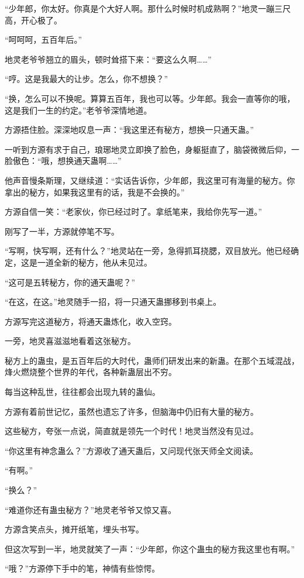 \begin{this_body}
“少年郎，你太好。你真是个大好人啊。那什么时候时机成熟啊？”地灵一蹦三尺高，开心极了。

“呵呵呵，五百年后。”

地灵老爷爷翘立的眉头，顿时耸搭下来：“要这么久啊……”

“哼。这是我最大的让步。怎么，你不想换？”

“换，怎么可以不换呢。算算五百年，我也可以等。少年郎。我会一直等你的哦，这是我们一生的约定。”老爷爷深情地道。

方源捂住脸。深深地叹息一声：“我这里还有秘方，想换一只通天蛊。”

一听到方源有求于自己，琅琊地灵立即换了脸色，身躯挺直了，脑袋微微后仰，一脸傲色：“哦，想换通天蛊啊……”

他声音慢条斯理，又继续道：“实话告诉你，少年郎，我这里可有海量的秘方。你拿出的秘方，如果我这里有的话，我是不会换的。”

方源自信一笑：“老家伙，你已经过时了。拿纸笔来，我给你先写一道。”

刚写了一半，方源就停笔不写。

“写啊，快写啊，还有什么？”地灵站在一旁，急得抓耳挠腮，双目放光。他已经确定，这是一道全新的秘方，他从未见过。

“这可是五转秘方，你的通天蛊呢？”

“在这，在这。”地灵随手一招，将一只通天蛊挪移到书桌上。

方源写完这道秘方，将通天蛊炼化，收入空窍。

一旁，地灵喜滋滋地看着这张秘方。

秘方上的蛊虫，是五百年后的大时代，蛊师们研发出来的新蛊。在那个五域混战，烽火燃烧整个世界的年代，各种新蛊层出不穷。

每当这种乱世，往往都会出现九转的蛊仙。

方源有着前世记忆，虽然也遗忘了许多，但脑海中仍旧有大量的秘方。

这些秘方，夸张一点说，简直就是领先一个时代！地灵当然没有见过。

“你这里有神念蛊么？”方源收了通天蛊后，又问现代张天师全文阅读。

“有啊。”

“换么？”

“难道你还有蛊虫秘方？”地灵老爷爷又惊又喜。

方源含笑点头，摊开纸笔，埋头书写。

但这次写到一半，地灵就笑了一声：“少年郎，你这个蛊虫的秘方我这里也有啊。”

“哦？”方源停下手中的笔，神情有些惊愕。


\end{this_body}
